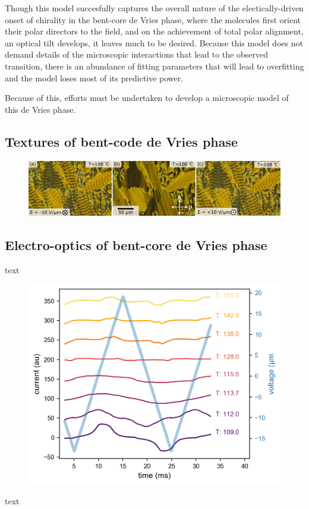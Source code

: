 \documentclass[aagreenthesis]{subfiles}
\begin{document}
Though this model succesfully captures the overall nature of the
electically-driven onset of chirality in the bent-core de Vries phase, where the
molecules first orient their polar directors to the field, and on the
achievement of total polar alignment, an optical tilt develops, it leaves much
to be desired. Because this model does not demand details of the
microscopic interactions that lead to the observed transition, there is an abundance of
fitting parameters that will lead to overfitting and the model loses most of its
predictive power.

Because of this, efforts must be undertaken to develop a microscopic model of
this de Vries phase.

\subsection{Textures of bent-code de Vries phase}

\begin{figure}[h!]
    \centering
    \includegraphics[width=.8\textwidth]{figs/pal30/textureSM2/sm1Textures100.png}
    \caption{\label{}}
\end{figure}


\subsection{Electro-optics of bent-core de Vries phase}
text
\begin{figure}[h!]
    \centering
    \includegraphics[width=.8\textwidth]{figs/pal30/prc/spacedSm1PRC.png}
    \caption{\label{}}
\end{figure}
text
\end{document}
